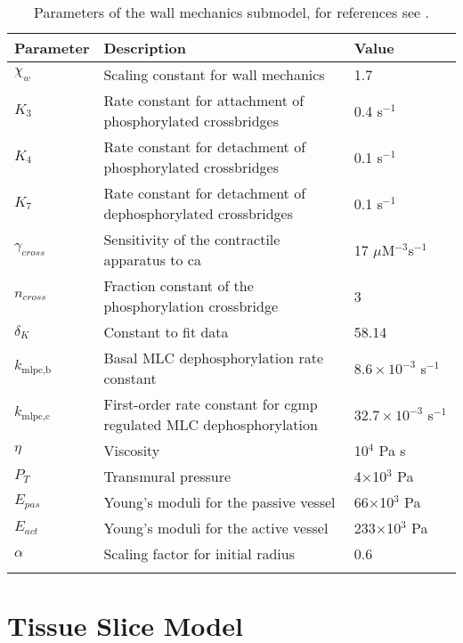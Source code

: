 \documentclass[11pt]{elsarticle}
\newcommand{\uM}{$\mu$M\xspace}
\newcommand{\e}[1]{\times 10^{#1}}
\newcommand{\psec}{s$^{-1}$\xspace}
\newcommand{\ca}{\gls{ca}\xspace}
\begin{document}
\begin{longtable}[h!]{ p{0.1\linewidth}   p{0.64\linewidth}   p{0.26\linewidth} }
	\hline
	Parameter & Description & Value \\
	\hline
$\chi_w$ 		& Scaling constant for wall mechanics & 1.7 \\
$K_{3}$      	& Rate constant for attachment of phosphorylated crossbridges	 & 0.4 \psec \\
$K_{4}$      	& Rate constant for detachment of phosphorylated crossbridges 	 & 0.1 \psec \\
$K_{7}$      	& Rate constant for detachment of dephosphorylated crossbridges 	& 0.1 \psec	 \\
$\gamma_{cross}$    & Sensitivity of the contractile apparatus to \ca		& 17 \uM$^{-3}$\psec \\
$n_{cross}$      	& Fraction constant of the phosphorylation crossbridge				& 3  \\
$ \delta_K $ 			& Constant to fit data			& 58.14 \\
$ k_{\text{mlpc,b}} $ & Basal MLC dephosphorylation rate constant			& $8.6\e{-3}$ \psec  \\
$ k_{\text{mlpc,c}} $ & First-order rate constant for \gls{cgmp} regulated MLC dephosphorylation & $32.7\e{-3}$ \psec  \\
$\eta$			& Viscosity															& 10$^4$ Pa s \\
$P_T$				& Transmural pressure												& 4$\times$10$^3$ Pa	 \\
${E}_{pas}$			& Young's moduli for the passive vessel								& 66$\times$10$^3$ Pa 	\\
${E}_{act}$			& Young's moduli for the active vessel								& 233$\times$10$^3$ Pa \\
$\alpha$			& Scaling factor for initial radius										& 0.6   \\
\hline
\caption{Parameters of the wall mechanics submodel, for references see \citet{Dormanns2015}.}
\end{longtable}

\section{Tissue Slice Model}
\end{document}
